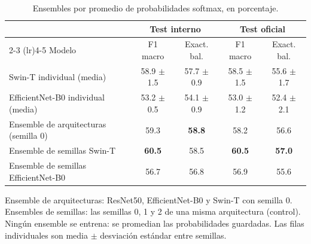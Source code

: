 \begin{table}[t]
\centering
\caption{Ensembles por promedio de probabilidades softmax, en porcentaje.}
\label{tab:tabla4_ensembles}
\footnotesize
\begin{tabular}{lcccc}
\toprule
 & \multicolumn{2}{c}{Test interno} & \multicolumn{2}{c}{Test oficial} \\
\cmidrule(lr){2-3} \cmidrule(lr){4-5}
Modelo & F1 macro & Exact. bal. & F1 macro  & Exact. bal.  \\
\midrule
Swin-T individual (media) & 58.9 $\pm$ 1.5 & 57.7 $\pm$ 0.9 & 58.5 $\pm$ 1.5 & 55.6 $\pm$ 1.7 \\
EfficientNet-B0 individual (media) & 53.2 $\pm$ 0.5 & 54.1 $\pm$ 0.9 & 53.0 $\pm$ 1.2 & 52.4 $\pm$ 2.1 \\
Ensemble de arquitecturas (semilla 0) & 59.3 & \textbf{58.8} & 58.2 & 56.6 \\
Ensemble de semillas Swin-T & \textbf{60.5} & 58.5 & \textbf{60.5} & \textbf{57.0} \\
Ensemble de semillas EfficientNet-B0 & 56.7 & 56.8 & 56.9 & 55.6 \\
\bottomrule
\end{tabular}
\par\vspace{2pt}
\parbox{\linewidth}{\scriptsize Ensemble de arquitecturas: ResNet50, EfficientNet-B0 y Swin-T con semilla 0. Ensembles de semillas: las semillas 0, 1 y 2 de una misma arquitectura (control). Ningún ensemble se entrena: se promedian las probabilidades guardadas. Las filas individuales son media $\pm$ desviación estándar entre semillas.}
\end{table}
